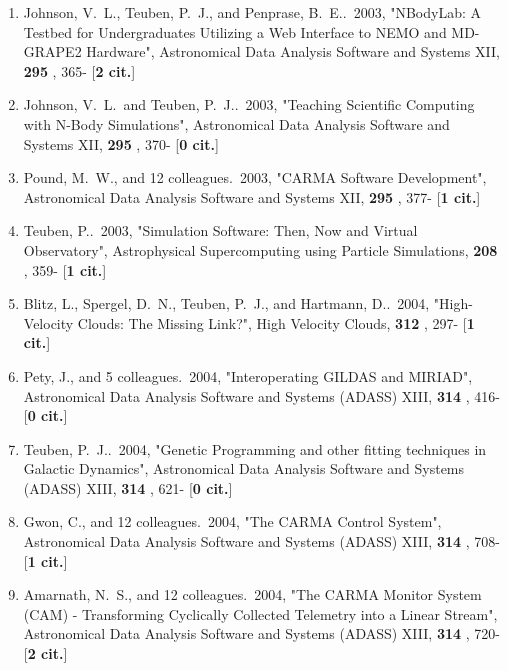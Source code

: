 \documentclass[11pt,letterpaper]{article}
\begin{document}
\begin{enumerate}[resume,label=\textbf{\arabic*}.]
\item  
Johnson, V.~L., Teuben, P.~J., and Penprase, B.~E..\  2003,  "NBodyLab: A 
Testbed for Undergraduates Utilizing a Web Interface to NEMO and MD-GRAPE2 
Hardware", Astronomical Data Analysis Software and Systems XII,  {\bf 295} 
, 365- [{\bf 2 cit.}] 

\item  
Johnson, V.~L.~and Teuben, P.~J..\  2003,  "Teaching Scientific Computing 
with N-Body Simulations", Astronomical Data Analysis Software and Systems 
XII,  {\bf 295} , 370- [{\bf 0 cit.}] 

\item  
Pound, M.~W., and 12 colleagues.\  2003,  "CARMA Software Development", 
Astronomical Data Analysis Software and Systems XII,  {\bf 295} , 377- 
[{\bf 1 cit.}] 

\item  
Teuben, P..\  2003,  "Simulation Software: Then, Now and Virtual 
Observatory", Astrophysical Supercomputing using Particle Simulations,  
{\bf 208} , 359- [{\bf 1 cit.}] 


\item  
Blitz, L., Spergel, D.~N., Teuben, P.~J., and Hartmann, D..\  2004,  
"High-Velocity Clouds: The Missing Link?", High Velocity Clouds,  {\bf 312} 
, 297- [{\bf 1 cit.}] 

\item  
Pety, J., and 5 colleagues.\  2004,  "Interoperating GILDAS and MIRIAD", 
Astronomical Data Analysis Software and Systems (ADASS) XIII,  {\bf 314} , 
416- [{\bf 0 cit.}] 

\item  
Teuben, P.~J..\  2004,  "Genetic Programming and other fitting techniques 
in Galactic Dynamics", Astronomical Data Analysis Software and Systems 
(ADASS) XIII,  {\bf 314} , 621- [{\bf 0 cit.}] 

\item  
Gwon, C., and 12 colleagues.\  2004,  "The CARMA Control System", 
Astronomical Data Analysis Software and Systems (ADASS) XIII,  {\bf 314} , 
708- [{\bf 1 cit.}] 

\item  
Amarnath, N.~S., and 12 colleagues.\  2004,  "The CARMA Monitor System 
(CAM) - Transforming Cyclically Collected Telemetry into a Linear Stream", 
Astronomical Data Analysis Software and Systems (ADASS) XIII,  {\bf 314} , 
720- [{\bf 2 cit.}] 


\end{enumerate}
\end{document}
